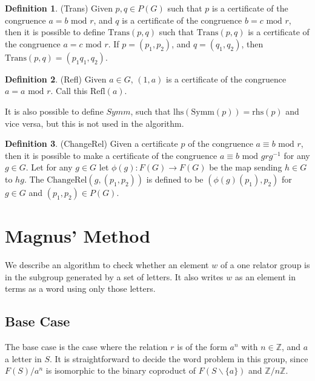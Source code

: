 \documentclass[11pt]{article} %
\theoremstyle{definition}
\theoremstyle{definition}
\theoremstyle{definition}
\theoremstyle{definition}
\theoremstyle{definition}
\theoremstyle{definition}
\newtheorem{subdef}{Definition}[theorem]
\begin{document}
\begin{subdef}(Trans)
  Given $p,q \in P(G)$ such that $p$ is a certificate of the congruence $a = b \text{ mod } r$,
  and $q$ is a certificate of the congruence $b = c \text{ mod } r$, then it is possible to define
  $\text{Trans}(p,q)$ such that $\text{Trans}(p,q)$ is a certificate of the congruence $a = c \text{ mod } r$.
  If $p = (p_1, p_2)$, and $q = (q_1, q_2)$, then $\text{Trans}(p,q) = (p_1q_1, q_2)$.
\end{subdef}

\begin{subdef}(Refl)
  Given $a \in G$, $(1, a)$ is a certificate of the congruence $a = a \text{ mod } r$. Call
  this $\text{Refl}(a)$.
\end{subdef}

It is also possible to define $\textit{Symm}$, such that $\text{lhs}(\text{Symm}(p)) = \text{rhs}(p)$
and vice versa, but this is not used in the algorithm.

\begin{subdef}(ChangeRel)
  Given a certificate $p$ of the congruence $a \equiv b \text{ mod } r$, then it is possible
  to make a certificate of the congruence $a \equiv b \text{ mod } g r g^{-1}$ for any $g \in G$.
  Let for any $g \in G$ let $\phi(g) : F(G) \to F(G)$ be the map sending $h \in G$ to
  $hg$. The $\text{ChangeRel}(g,(p_1,p_2))$ is defined to be $(\phi(g)(p_1), p_2)$ for
  $g \in G$ and $(p_1, p_2) \in P(G)$.
\end{subdef}

\section{Magnus' Method}

We describe an algorithm to check whether an element $w$ of a one relator group is
in the subgroup generated by a set of letters. It also writes $w$ as an element in terms
as a word using only those letters.

\subsection{Base Case}

The base case is the case where the relation $r$ is of the form $a^n$ with
$n \in \mathbb{Z}$, and $a$ a letter in $S$. It is straightforward to decide
the word problem in this group, since $F(S) / a^n$ is isomorphic
to the binary coproduct of $F(S \backslash \{a\})$ and $\mathbb{Z}/n\mathbb{Z}$.
\end{document}

